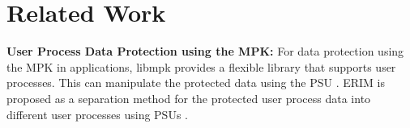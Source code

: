 \section{Related Work}  \label{section:related_works}


{\bf User Process Data Protection using the MPK:}
For data protection using the MPK in applications, libmpk provides a flexible
library that supports user processes. This can manipulate the protected data
using the PSU \cite{libmpk}.
ERIM is proposed as a separation method for the protected user process data into
different user processes using PSUs \cite{erim}.

